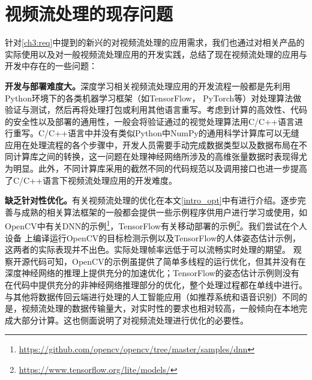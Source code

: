 \section{视频流处理的现存问题}
针对\ref{ch3:req}中提到的新兴的对视频流处理的应用需求，我们也通过对相关产品的实际使用以及对一般视频流处理应用的开发实践，总结了现在视频流处理的应用与开发中存在的一些问题：\par
\textbf{开发与部署难度大。}深度学习相关视频流处理应用的开发流程一般都是先利用Python环境下的各类机器学习框架（如TensorFlow， PyTorch等）对处理算法做验证与测试，然后再将处理打包或利用其他语言重写。考虑到计算的高效性、代码的安全性以及部署的通用性，一般会将验证通过的视觉处理算法用C/C++语言进行重写。C/C++语言中并没有类似Python中NumPy\cite{oliphant2006guide}的通用科学计算库可以无缝应用在处理流程的各个步骤中，开发人员需要手动完成数据类型以及数据布局在不同计算库之间的转换，这一问题在处理神经网络所涉及的高维张量数据时表现得尤为明显。此外，不同计算库采用的截然不同的代码规范以及调用接口也进一步提高了C/C++语言下视频流处理应用的开发难度。\par
\textbf{缺乏针对性优化。}有关视频流处理的优化在本文\ref{intro_opt}中有进行介绍。逐步完善与成熟的相关算法框架的一般都会提供一些示例程序供用户进行学习或使用，如OpenCV中有关DNN的示例\footnote{\url{https://github.com/opencv/opencv/tree/master/samples/dnn}}，TensorFlow有关移动部署的示例\footnote{\url{https://www.tensorflow.org/lite/models/}}。我们尝试在个人设备%
上编译运行OpenCV的目标检测示例以及TensorFlow的人体姿态估计示例，这两者的实际表现并不出色。实际处理帧率远低于可以流畅实时处理的期望。
观察开源代码可知，OpenCV的示例虽提供了简单多线程的运行优化，但其并没有在深度神经网络的推理上提供充分的加速优化；TensorFlow的姿态估计示例则没有在代码中提供充分的非神经网络推理部分的优化，整个处理过程都在单线中进行。与其他将数据传回云端进行处理的人工智能应用（如推荐系统和语音识别）不同的是，视频流处理的数据传输量大，对实时性的要求也相对较高，一般倾向在本地完成大部分计算。这也侧面说明了对视频流处理进行优化的必要性。


